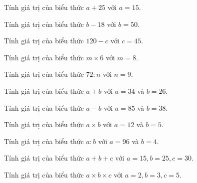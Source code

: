 \begin{ex}
Tính giá trị của biểu thức $a + 25$ với $a = 15$.
\end{ex}

\begin{ex}
Tính giá trị của biểu thức $b - 18$ với $b = 50$.
\end{ex}

\begin{ex}
Tính giá trị của biểu thức $120 - c$ với $c = 45$.
\end{ex}

\begin{ex}
Tính giá trị của biểu thức $m \times 6$ với $m = 8$.
\end{ex}

\begin{ex}
Tính giá trị của biểu thức $72 : n$ với $n = 9$.
\end{ex}

\begin{ex}
Tính giá trị của biểu thức $a + b$ với $a = 34$ và $b = 26$.
\end{ex}

\begin{ex}
Tính giá trị của biểu thức $a - b$ với $a = 85$ và $b = 38$.
\end{ex}

\begin{ex}
Tính giá trị của biểu thức $a \times b$ với $a = 12$ và $b = 5$.
\end{ex}

\begin{ex}
Tính giá trị của biểu thức $a : b$ với $a = 96$ và $b = 4$.
\end{ex}

\begin{ex}
Tính giá trị của biểu thức $a + b + c$ với $a = 15, b = 25, c = 30$.
\end{ex}

\begin{ex}
Tính giá trị của biểu thức $a \times b \times c$ với $a = 2, b = 3, c = 5$.
\end{ex}

